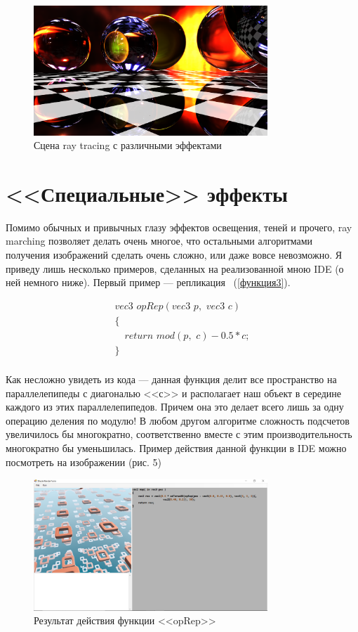 \documentclass[14pt]{matmex-diploma}
\begin{document}
\begin{figure}[h]
\label{ray tracing}
\centering
\includegraphics[width = 250pt]{scene.png}
\caption{Сцена ray tracing с различными эффектами}
\end{figure}

\section{<<Специальные>> эффекты}

Помимо обычных и привычных глазу эффектов освещения, теней и прочего, ray marching позволяет делать очень многое, что остальными алгоритмами получения
изображений сделать очень сложно, или даже вовсе невозможно. Я приведу лишь несколько примеров, сделанных на реализованной мною IDE (о ней немного ниже).
Первый пример --- репликация ~(\ref{функция3}).

\begin{equation}
\label{функция3}
\begin{array}{ll}
vec3\,\,opRep(vec3\,\,p,\,\,vec3\,\,c)         \\
\{                                             \\
\,\,\,\,\,\,return\,\,mod(p,\,\,c) - 0.5 * c;  \\
\}                                             \\
\end{array}
\end{equation}

Как несложно увидеть из кода --- данная функция делит все пространство на параллелепипеды с диагональю <<с>> и располагает наш объект в середине каждого 
из этих параллелепипедов. Причем она это делает всего лишь за одну операцию деления по модулю! В любом другом алгоритме сложность подсчетов увеличилось
бы многократно, соответственно вместе с этим производительность многократно бы уменьшилась. Пример действия данной функции в IDE можно посмотреть на изображении (рис. 5)

\begin{figure}[h]
\label{replace}
\centering
\includegraphics[width = 250pt]{replace.png}
\caption{Результат действия функции <<opRep>>}
\end{figure}
\end{document}
